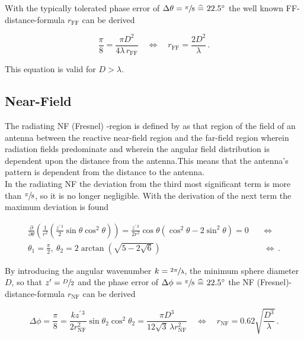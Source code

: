 With the typically tolerated phase error of $\Delta\theta = \sfrac{\pi}{8} \ \widehat{=}\  22.5^\circ$ the well known \ac{FF}-distance-formula $r_{\text{FF}}$ can be derived

\begin{equation}
\frac{\pi}{8} = \frac{\pi D^2}{4\lambda\, r_{\text{FF}}} \quad \Leftrightarrow \quad r_{\text{FF}} = \frac{2D^2}{\lambda}\,.
\label{eq:ff}
\end{equation}

This equation is valid for $D > \lambda$. \cite{balanis}

\subsection{Near-Field}

The radiating \ac{NF} (Fresnel) -region is defined by \cite{balanis} as \glqq that region of the field of an antenna between the reactive near-field region and the far-field region wherein radiation fields predominate and wherein the angular field distribution is dependent upon the distance from the antenna.\grqq{ }This means that the antenna's pattern is dependent from the distance to the antenna.\\
In the radiating \ac{NF} the deviation from the third most significant term is more than $\sfrac{\pi}{8}$, so it is no longer negligible. With the derivation of the next term the maximum deviation is found

\begin{align}
\frac{\partial}{\partial\theta}\left(\frac{1}{r^2}\left(\frac{z^{\prime\, 3}}{2}\sin\theta\cos^2\theta\right)\right) = \frac{z^{\prime\, 3}}{2r^2}\cos\theta\left(\cos^2\theta-2\sin^2\theta\right) = 0 \quad &\Leftrightarrow\\ 
\theta_1 = \frac{\pi}{2},\ \theta_2=2\arctan\left(\sqrt{5-2\sqrt{6}}\right) \quad &\Leftrightarrow\,.
\end{align}

By introducing the angular wavenumber $k=\sfrac{2\pi}{\lambda}$, the minimum sphere diameter $D$, so that $z'=\sfrac{D}{2}$ and the phase error of $\Delta\phi = \sfrac{\pi}{8} \ \widehat{=}\  22.5^\circ$ the \ac{NF} (Fresnel)-distance-formula $r_{\text{NF}}$ can be derived

\begin{equation}
\Delta\phi = \frac{\pi}{8} = \frac{kz^{\prime\, 3}}{2r_{\text{NF}}^2}\sin\theta_2\cos^2\theta_2= \frac{\pi D^3}{12\sqrt{3}\,\lambda r_{\text{NF}}^2} \quad \Leftrightarrow \quad r_{\text{NF}}=0.62\sqrt{\frac{D^3}{\lambda}}\,.
\end{equation}

